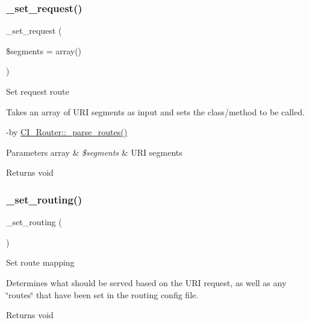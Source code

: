 \subsubsection{\texorpdfstring{\+\_\+set\+\_\+request()}{\_set\_request()}}
{\footnotesize\ttfamily \+\_\+set\+\_\+request (\begin{DoxyParamCaption}\item[{}]{\$segments = {\ttfamily array()} }\end{DoxyParamCaption})\hspace{0.3cm}{\ttfamily [protected]}}

Set request route

Takes an array of U\+RI segments as input and sets the class/method to be called.

-\/by \mbox{\hyperlink{class_c_i___router_a55a42fae865d03334b49baa5a5a6bd0b}{C\+I\+\_\+\+Router\+::\+\_\+parse\+\_\+routes()}} 
\begin{DoxyParams}[1]{Parameters}
array & {\em \$segments} & U\+RI segments \\
\hline
\end{DoxyParams}
\begin{DoxyReturn}{Returns}
void 
\end{DoxyReturn}
\mbox{\label{class_c_i___router_abc9f3e0d48cec66f93a7f103c9a65892}} 
\subsubsection{\texorpdfstring{\+\_\+set\+\_\+routing()}{\_set\_routing()}}
{\footnotesize\ttfamily \+\_\+set\+\_\+routing (\begin{DoxyParamCaption}{ }\end{DoxyParamCaption})\hspace{0.3cm}{\ttfamily [protected]}}

Set route mapping

Determines what should be served based on the U\+RI request, as well as any \char`\"{}routes\char`\"{} that have been set in the routing config file.

\begin{DoxyReturn}{Returns}
void 
\end{DoxyReturn}
\mbox{\label{class_c_i___router_a488aa4aaa52c36c4e6c791e7bfd76358}} 

